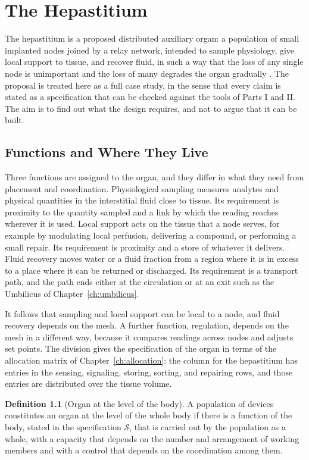 \documentclass[11pt,openany]{book}
\theoremstyle{definition}
\newtheorem{definition}{Definition}[chapter]
\theoremstyle{remark}
\newcommand{\Spec}{\mathcal{S}}
\begin{document}
\chapter{The Hepastitium}
\label{ch:hepastitium}

The hepastitium is a proposed distributed auxiliary organ: a population of small implanted nodes joined by a relay network, intended to sample physiology, give local support to tissue, and recover fluid, in such a way that the loss of any single node is unimportant and the loss of many degrades the organ gradually \cite{flyxion2026cm,flyxion2026hepastitium}. The proposal is treated here as a full case study, in the sense that every claim is stated as a specification that can be checked against the tools of Parts I and II. The aim is to find out what the design requires, and not to argue that it can be built.

\section{Functions and Where They Live}

Three functions are assigned to the organ, and they differ in what they need from placement and coordination. Physiological sampling measures analytes and physical quantities in the interstitial fluid close to tissue. Its requirement is proximity to the quantity sampled and a link by which the reading reaches wherever it is used. Local support acts on the tissue that a node serves, for example by modulating local perfusion, delivering a compound, or performing a small repair. Its requirement is proximity and a store of whatever it delivers. Fluid recovery moves water or a fluid fraction from a region where it is in excess to a place where it can be returned or discharged. Its requirement is a transport path, and the path ends either at the circulation or at an exit such as the Umbilicus of Chapter~\ref{ch:umbilicus}.

It follows that sampling and local support can be local to a node, and fluid recovery depends on the mesh. A further function, regulation, depends on the mesh in a different way, because it compares readings across nodes and adjusts set points. The division gives the specification of the organ in terms of the allocation matrix of Chapter~\ref{ch:allocation}: the column for the hepastitium has entries in the sensing, signaling, storing, sorting, and repairing rows, and those entries are distributed over the tissue volume.

\begin{definition}[Organ at the level of the body]
A population of devices constitutes an organ at the level of the whole body if there is a function of the body, stated in the specification $\Spec$, that is carried out by the population as a whole, with a capacity that depends on the number and arrangement of working members and with a control that depends on the coordination among them.
\end{definition}
\end{document}
